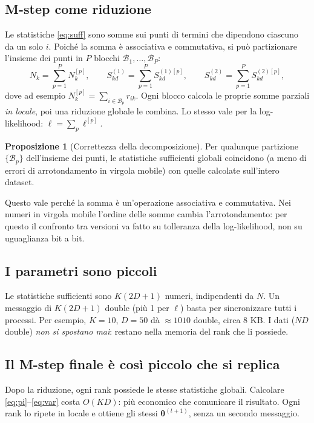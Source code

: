 \documentclass[11pt,a4paper]{article}
\newcommand{\bth}{\boldsymbol{\theta}}
\theoremstyle{definition}
\newtheorem{prop}{Proposizione}
\begin{document}
\subsection{M-step come riduzione}
Le statistiche \eqref{eq:suff} sono somme sui punti di termini che dipendono
ciascuno da un solo $i$. Poiché la somma è associativa e commutativa, si può
partizionare l'insieme dei punti in $P$ blocchi $\mathcal{B}_1,\dots,\mathcal{B}_P$:
\begin{equation}
N_k=\sum_{p=1}^{P}N_k^{[p]},\qquad
S_{kd}^{(1)}=\sum_{p=1}^{P}S_{kd}^{(1)[p]},\qquad
S_{kd}^{(2)}=\sum_{p=1}^{P}S_{kd}^{(2)[p]},
\end{equation}
dove ad esempio $N_k^{[p]}=\sum_{i\in\mathcal{B}_p}r_{ik}$. Ogni blocco calcola
le proprie somme parziali \emph{in locale}, poi una riduzione globale le combina.
Lo stesso vale per la log-likelihood: $\ell=\sum_p\ell^{[p]}$.

\begin{prop}[Correttezza della decomposizione]
Per qualunque partizione $\{\mathcal{B}_p\}$ dell'insieme dei punti, le
statistiche sufficienti globali coincidono (a meno di errori di arrotondamento
in virgola mobile) con quelle calcolate sull'intero dataset.
\end{prop}
\noindent
Questo vale perché la somma è un'operazione associativa e commutativa. Nei numeri
in virgola mobile l'ordine delle somme cambia l'arrotondamento: per questo il
confronto tra versioni va fatto su tolleranza della log-likelihood, non su
uguaglianza bit a bit.

\subsection{I parametri sono piccoli}
Le statistiche sufficienti sono $K(2D+1)$ numeri, indipendenti da $N$. Un
messaggio di $K(2D+1)$ double (più 1 per $\ell$) basta per sincronizzare tutti i
processi. Per esempio, $K=10$, $D=50$ dà $\approx 1010$ double, circa 8 KB.
I dati ($ND$ double) \emph{non si spostano mai}: restano nella memoria del
rank che li possiede.

\subsection{Il M-step finale è così piccolo che si replica}
Dopo la riduzione, ogni rank possiede le stesse statistiche globali. Calcolare
\eqref{eq:pi}--\eqref{eq:var} costa $O(KD)$: più economico che comunicare il
risultato. Ogni rank lo ripete in locale e ottiene gli stessi $\bth^{(t+1)}$,
senza un secondo messaggio.
\end{document}
